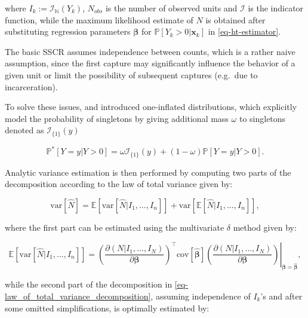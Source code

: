 \documentclass[
]{jss}
\newcommand{\1}{\mathcal{I}} \newcommand{\bZero}{\boldsymbol{0}}
\begin{document}
where \(I_{k}:=\mathcal{I}_{\mathbb{N}}(Y_{k})\), \(N_{obs}\) is the
number of observed units and \(\mathcal{I}\) is the indicator function,
while the maximum likelihood estimate of \(N\) is obtained after
substituting regression parameters \(\boldsymbol{\beta}\) for
\(\mathbb{P}[Y_{k}>0|\boldsymbol{x}_{k}]\) in \eqref{eq-ht-estimator}.

The basic SSCR assumes independence between counts, which is a rather
naive assumption, since the first capture may significantly influence
the behavior of a given unit or limit the possibility of subsequent
captures (e.g.~due to incarceration).

To solve these issues, \citet{godwin2017estimation} and
\citet{ztoi-oizt-poisson} introduced one-inflated distributions, which
explicitly model the probability of singletons by giving additional mass
\(\omega\) to singletons denoted as \(\mathcal{I}_{\{1\}}(y)\)
\citep[cf.][]{bohning2024one}

\begin{equation*}
  \mathbb{P}^{\ast}[Y=y|Y>0] =
  \omega\mathcal{I}_{\{1\}}(y)+(1-\omega)\mathbb{P}[Y=y|Y>0].
\end{equation*}

Analytic variance estimation is then performed by computing two parts of
the decomposition according to the law of total variance given by:

\begin{equation}\label{eq-law_of_total_variance_decomposition}
  \text{var}[\hat{N}] = \mathbb{E}\left[\text{var}
  \left[\hat{N}|I_{1},\dots,I_{n}\right]\right] + 
  \text{var}\left[\mathbb{E}[\hat{N}|I_{1},\dots,I_{n}]\right],
\end{equation}

where the first part can be estimated using the multivariate \(\delta\)
method given by:

\begin{equation*}
  \mathbb{E}\left[\text{var} \left[\hat{N}|I_{1},\dots,I_{n}\right]\right] =
  \left.\left(\frac{\partial(N|I_1,\dots,I_N)}{\partial\boldsymbol{\beta}}\right)^\top
  \text{cov}\left[\hat{\boldsymbol{\beta}}\right]
  \left(\frac{\partial(N|I_1,\dots,I_N)}{\partial\boldsymbol{\beta}}\right)
  \right|_{\boldsymbol{\beta}=\hat{\boldsymbol{\beta}}},
\end{equation*}

while the second part of the decomposition in
\eqref{eq-law_of_total_variance_decomposition}, assuming independence of
\(I_{k}\)'s and after some omitted simplifications, is optimally
estimated by:
\end{document}

